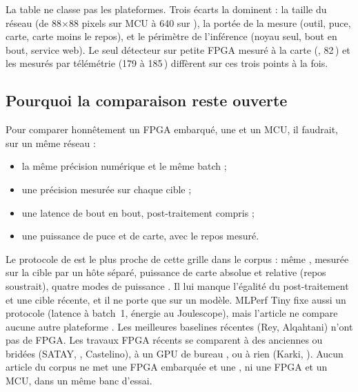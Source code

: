 La table ne classe pas les plateformes. Trois écarts la dominent : la taille du réseau
(de 88$\times$88 pixels sur MCU à 640 sur ), la portée de la mesure (outil, puce,
carte, carte moins le repos), et le périmètre de l'inférence (noyau seul, bout en bout,
service web). Le seul détecteur sur petite FPGA mesuré à la carte (, 82\,) et
les  mesurés par télémétrie (179 à 185\,) diffèrent sur ces trois points à la fois.

\subsection{Pourquoi la comparaison reste ouverte}

Pour comparer honnêtement un FPGA embarqué, une  et un MCU, il faudrait, sur un même
réseau :
\begin{itemize}
  \item la même précision numérique et le même batch ;
  \item une précision mesurée sur chaque cible ;
  \item une latence de bout en bout, post-traitement compris ;
  \item une puissance de puce et de carte, avec le repos mesuré.
\end{itemize}
Le protocole de \citet{arxiv-2304.11580-framework-benchmarking-real-time-embedded} est le
plus proche de cette grille dans le corpus : même ,  mesurée sur la cible par un
hôte séparé, puissance de carte absolue et relative (repos soustrait), quatre modes de
puissance  . Il lui manque l'égalité du post-traitement et une cible
récente, et il ne porte que sur un modèle. MLPerf Tiny fixe aussi un protocole (latence à
batch~1, énergie au Joulescope), mais l'article ne compare aucune autre plateforme
\citep[§1, §4.4]{arxiv-2206.11791-open-source-fpga-ml-codesign}\pp. Les meilleures
baselines  récentes (Rey, Alqahtani\pp) n'ont pas de FPGA. Les travaux FPGA récents
se comparent à des  anciennes ou bridées (SATAY, \pp, Castelino), à un GPU de
bureau \citep[Table~10]{2026-fata-low-cost-fpga-enhanced-cnn}, ou à rien (Karki\pp, \pp). Aucun article du corpus ne met une FPGA
embarquée et une , ni une FPGA et un MCU, dans un même banc d'essai.
